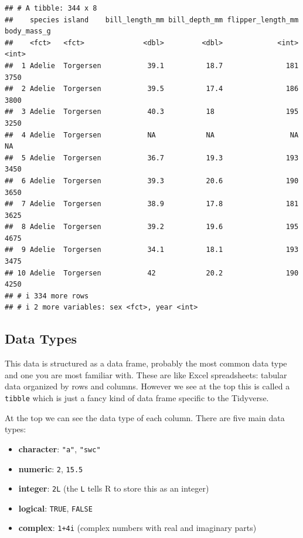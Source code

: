 \documentclass[
]{book}
\begin{document}
\begin{verbatim}
## # A tibble: 344 x 8
##    species island    bill_length_mm bill_depth_mm flipper_length_mm body_mass_g
##    <fct>   <fct>              <dbl>         <dbl>             <int>       <int>
##  1 Adelie  Torgersen           39.1          18.7               181        3750
##  2 Adelie  Torgersen           39.5          17.4               186        3800
##  3 Adelie  Torgersen           40.3          18                 195        3250
##  4 Adelie  Torgersen           NA            NA                  NA          NA
##  5 Adelie  Torgersen           36.7          19.3               193        3450
##  6 Adelie  Torgersen           39.3          20.6               190        3650
##  7 Adelie  Torgersen           38.9          17.8               181        3625
##  8 Adelie  Torgersen           39.2          19.6               195        4675
##  9 Adelie  Torgersen           34.1          18.1               193        3475
## 10 Adelie  Torgersen           42            20.2               190        4250
## # i 334 more rows
## # i 2 more variables: sex <fct>, year <int>
\end{verbatim}

\hypertarget{data-types}{%
\subsection{Data Types}\label{data-types}}

This data is structured as a data frame, probably the most common data type and one you are most familiar with. These are like Excel spreadsheets: tabular data organized by rows and columns. However we see at the top this is called a \texttt{tibble} which is just a fancy kind of data frame specific to the Tidyverse.

At the top we can see the data type of each column. There are five main data types:

\begin{itemize}
\item
  \textbf{character}: \texttt{"a"}, \texttt{"swc"}
\item
  \textbf{numeric}: \texttt{2}, \texttt{15.5}
\item
  \textbf{integer}: \texttt{2L} (the \texttt{L} tells R to store this as an integer)
\item
  \textbf{logical}: \texttt{TRUE}, \texttt{FALSE}
\item
  \textbf{complex}: \texttt{1+4i} (complex numbers with real and imaginary parts)
\end{itemize}
\end{document}
